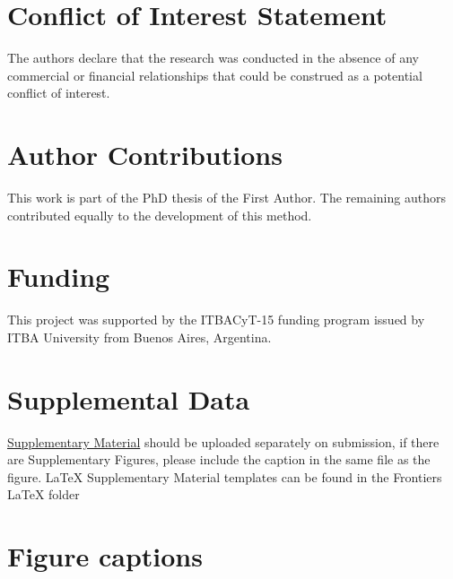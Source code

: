 \documentclass[utf8]{frontiersSCNS} %
\begin{document}
\section*{Conflict of Interest Statement}
The authors declare that the research was conducted in the absence of any commercial or financial relationships that could be construed as a potential conflict of interest.

\section*{Author Contributions}

This work is part of the PhD thesis of the First Author.  The remaining authors contributed equally to the development of this method.

\section*{Funding}
This project was supported by the ITBACyT-15 funding program issued by ITBA University from Buenos Aires, Argentina.


\section*{Supplemental Data}
 \href{http://home.frontiersin.org/about/author-guidelines#SupplementaryMaterial}{Supplementary Material} should be uploaded separately on submission, if there are Supplementary Figures, please include the caption in the same file as the figure. LaTeX Supplementary Material templates can be found in the Frontiers LaTeX folder 





\section*{Figure captions}

\end{document}
